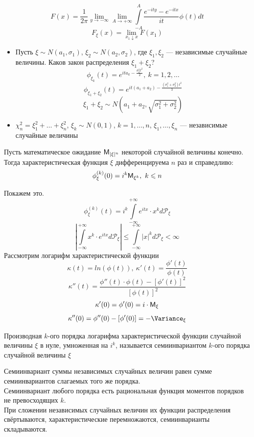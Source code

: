 \begin{enumerate}[wide, labelwidth=!, labelindent=0pt]
\[
	F(x) = \frac{1}{2 \pi} \lim\limits_{y \to -\infty} \lim\limits_{A \to +\infty} \int\limits_{-A}^{A} \frac{e^{-ity} - e^{-itx}}{it} \phi(t) dt
\]
\[
	F_{\xi} (x) = \lim\limits_{x_1 \downarrow x} F(x_1)
\]
\begin{example} 
	\begin{itemize}
		\item Пусть $\xi \sim N(a_1, \sigma_1)$, $\xi_2 \sim N(a_2, \sigma_2)$, где $\xi_1, \xi_2$ --- независимые случайные величины. Каков закон распределения $\xi_1 + \xi_2$?
\[
	\phi_{\xi_k} (t) = e^{it a_k - \frac{\sigma^2_k t^2}{2}}, \ k = 1, 2, \ldots
\]
\[
	\phi_{\xi_1 + \xi_2} (t) = e^{it(a_1 + a_2) - \frac{(\sigma_1^2 + \sigma_2^2)t^2}{3}}
\]
\[
	\xi_1 + \xi_2 \sim N \left(a_1 + a_2, \sqrt{\sigma_1^2 + \sigma_2^2} \right)
\]
\item $\chi_n^2 = \xi_1^2 + \ldots + \xi_n^2$, $\xi_k \sim N (0, 1)$, $k = 1, \ldots, n$, $\xi_1, \ldots,\xi_n$ --- независимые случайные величины
	\end{itemize}
\end{example}
\begin{theorem}
	Пусть математическое ожидание $\mathsf{M}_{|\xi|^n}$ некоторой случайной величины конечно. Тогда характеристическая функция $\xi$ дифференцируема $n$ раз и справедливо:
\[
	\phi_{\xi}^{(k)} (0) = i^k \mathsf{M}_{\xi^k}, \ k \leqslant n
\]
\end{theorem}
Покажем это.
\[
	\phi_{\xi}^{(k)} (t) = i^k \int\limits_{-\infty}^{+\infty} e^{itx} \cdot x^k d \mathcal{P}_{\xi}
\]
\[
	\left| \int\limits_{-\infty}^{+\infty} x^k \cdot e^{itx} d \mathcal{P}_{\xi} \right| \leqslant \int\limits_{-\infty}^{+\infty} |x|^k d \mathcal{P}_{\xi} < \infty
\]
Рассмотрим логарифм характеристической функции
\[
	\kappa (t) = ln(\phi(t)), \ \kappa'(t) = \frac{\phi'(t)}{\phi(t)}
\]
\[
	\kappa''(t) = \frac{\phi''(t) \cdot \phi(t) - [\phi'(t)]^2}{[\phi(t)]^2}
\]
\[
	\kappa'(0) = \phi'(0) = i \cdot \mathsf{M}_{\xi}
\]
\[
	\kappa''(0) = \phi''(0) - [\phi'(0)] = - \Variance_{\xi}
\]
\begin{definition}
	Производная $k$-ого порядка логарифма характеристической функции случайной величины $\xi$ в нуле, умноженная на $i^k$, называется семиинвариантом $k$-ого порядка случайной величины $\xi$
\end{definition}
Семиинвариант суммы независимых случайных величин равен сумме семиинвариантов слагаемых того же порядка. \\
Семиинвариант любого порядка есть рациональная функция моментов порядков не превосходящих $k$. \\
При сложении независимых случайных величин их функции распределения свёртываются, характеристические перемножаются, семиинварианты складываются.


\end{enumerate}
